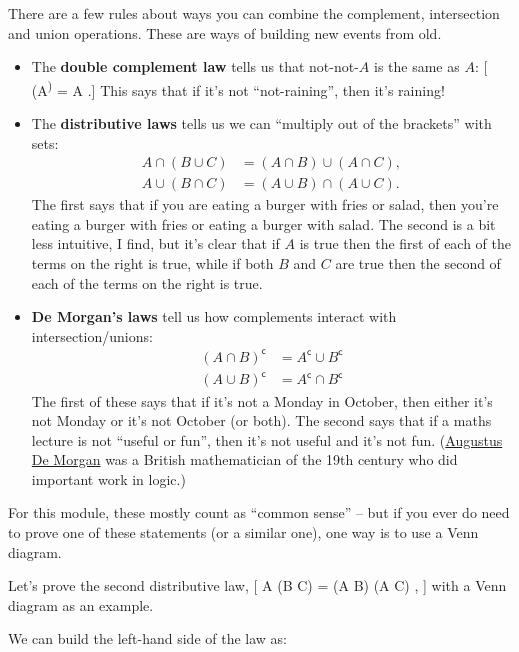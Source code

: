 \documentclass[
  letterpaper,
  DIV=11,
  numbers=noendperiod]{scrreprt}
\providecommand{\tightlist}{%
  \setlength{\itemsep}{0pt}\setlength{\parskip}{0pt}}\usepackage{longtable,booktabs,array}
\theoremstyle{remark}
\begin{document}
There are a few rules about ways you can combine the complement,
intersection and union operations. These are ways of building new events
from old.

\begin{itemize}
\tightlist
\item
  The \textbf{double complement law} tells us that not-not-\(A\) is the
  same as \(A\): {[} (A\textsuperscript{)} = A .{]}
  This says that if it's not ``not-raining'', then it's raining!
\item
  The \textbf{distributive laws} tells us we can ``multiply out of the
  brackets'' with sets: \begin{align*}
  A \cap (B \cup C) &= (A \cap B) \cup (A \cap C) ,\\
  A \cup (B \cap C) &= (A \cup B) \cap (A \cup C) .
  \end{align*} The first says that if you are eating a burger with fries
  or salad, then you're eating a burger with fries or eating a burger
  with salad. The second is a bit less intuitive, I find, but it's clear
  that if \(A\) is true then the first of each of the terms on the right
  is true, while if both \(B\) and \(C\) are true then the second of
  each of the terms on the right is true.
\item
  \textbf{De Morgan's laws} tell us how complements interact with
  intersection/unions: \begin{align*}
  (A \cap B)^\mathsf{c}&= A^\mathsf{c}\cup B^\mathsf{c}\\
  (A \cup B)^\mathsf{c}&= A^\mathsf{c}\cap B^\mathsf{c}
  \end{align*} The first of these says that if it's not a Monday in
  October, then either it's not Monday or it's not October (or both).
  The second says that if a maths lecture is not ``useful or fun'', then
  it's not useful and it's not fun.
  (\href{https://mathshistory.st-andrews.ac.uk/Biographies/De_Morgan/}{Augustus
  De Morgan} was a British mathematician of the 19th century who did
  important work in logic.)
\end{itemize}

For this module, these mostly count as ``common sense'' -- but if you
ever do need to prove one of these statements (or a similar one), one
way is to use a Venn diagram.

Let's prove the second distributive law, {[} A \cup (B \cap C) = (A
\cup B) \cap (A \cup C) , {]} with a Venn diagram as an example.

We can build the left-hand side of the law as:
\end{document}
